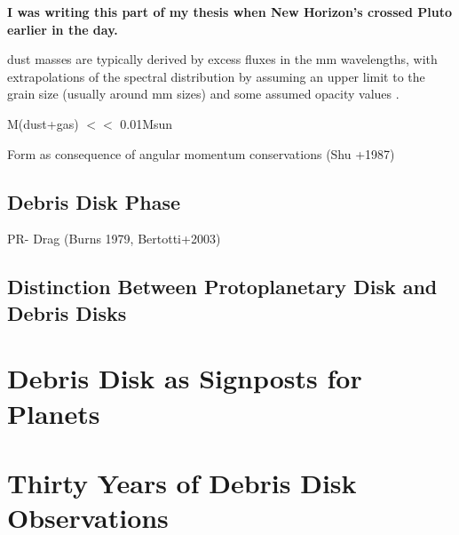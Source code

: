     
    \textbf{I was writing this part of my thesis when New Horizon's crossed Pluto earlier in the day.}
    
    
    dust masses are typically derived by excess fluxes in the mm wavelengths, with extrapolations of the spectral distribution by assuming an upper limit to the grain size (usually around mm sizes) and some assumed opacity values \citep{Beckwith1990}. 
    
    M(dust+gas) $<<$ 0.01Msun
    
    
    Form as consequence of angular momentum conservations (Shu +1987)
    
    
    
    \subsection{Debris Disk Phase}
PR- Drag (Burns 1979, Bertotti+2003)

    \subsection{Distinction Between Protoplanetary Disk and Debris Disks}

    
\section{Debris Disk as Signposts for Planets}


\section{Thirty Years of Debris Disk Observations}












